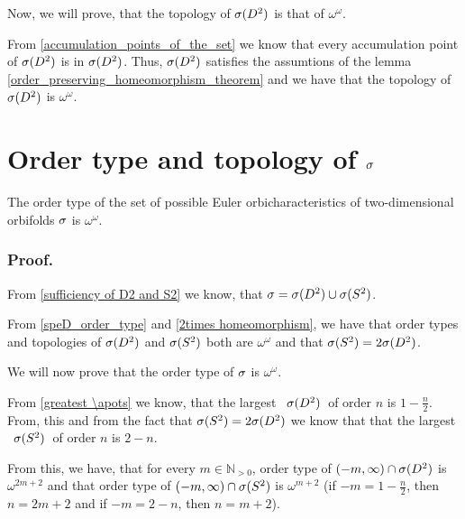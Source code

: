 Now, we will prove, that the topology of ${{\sigma}(D^2)}$ is that of $\omega^\omega$.

From \ref{accumulation_points_of_the_set} we know that every accumulation point 
of ${{\sigma}(D^2)}$ is in ${{\sigma}(D^2)}$. 
Thus, ${{\sigma}(D^2)}$ satisfies the assumtions of the lemma \ref{order_preserving_homeomorphism_theorem} 
and 
we have that 
the topology of ${{\sigma}(D^2)}$ is $\omega^\omega$. 













\section{Order type and topology of ${\sigma}$}
\begin{theorem}
The order type of the set of possible Euler orbicharacteristics of two-dimensional orbifolds 
${\sigma}$ is $\omega^\omega$. 
\end{theorem}
\subsubsection{Proof.}
From \ref{sufficiency of D2 and S2}
we know, that ${\sigma} = {{\sigma}(D^2)} \cup {{\sigma}(S^2)}$.

From \ref{speD_order_type} and \ref{2times homeomorphism}, we have that order types and 
topologies of ${{\sigma}(D^2)}$ and ${{\sigma}(S^2)}$ both are $\omega^\omega$ and that ${{\sigma}(S^2)} = 2{{\sigma}(D^2)}$.  

We will now prove that the order type of ${\sigma}$ is $\omega^\omega$.

From \ref{greatest \apots} we know, that the largest \apots\ ${{\sigma}(D^2)}$\ of order $n$ is 
$1-\frac{n}{2}$. From, this and from the fact that ${{\sigma}(S^2)} = 2{{\sigma}(D^2)}$ we know that 
that the largest \apots\ ${{\sigma}(S^2)}$\ of order $n$ is 
$2-n$. 

From this, we have, that for every $m \in \mathbb{N}_{>0}$, order type of 
$(-m, \infty) \cap {{\sigma}(D^2)}$ is $\omega^{2m+2}$ and that order type 
of $(-m, \infty) \cap {{\sigma}(S^2)}$ is $\omega^{m+2}$ (if $-m = 1-\frac{n}{2}$, then 
$n = 2m + 2$ and 
if $-m = 2 - n$, then $n = m + 2$). 


